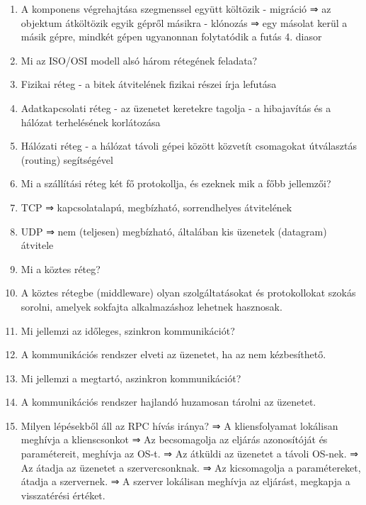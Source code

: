 \documentclass[twoside, a4paper, 12pt]{article}
\begin{document}
\begin{enumerate}
            \item A komponens végrehajtása szegmenssel együtt költözik
                - migráció ⇒ az objektum átköltözik egyik gépről másikra
                - klónozás ⇒ egy másolat kerül a másik gépre, mindkét gépen ugyanonnan folytatódik a futás
                4. diasor
            \item  Mi az ISO/OSI modell alsó három rétegének feladata?
            \item Fizikai réteg
                - a bitek átvitelének fizikai részei írja lefutása
            \item Adatkapcsolati réteg
                - az üzenetet keretekre tagolja
                - a hibajavítás és a hálózat terhelésének korlátozása
            \item Hálózati réteg
                - a hálózat távoli gépei között közvetít csomagokat útválasztás (routing) segítségével
            \item  Mi a szállítási réteg két fő protokollja, és ezeknek mik a főbb jellemzői?
            \item TCP ⇒ kapcsolatalapú, megbízható, sorrendhelyes átvitelének
            \item UDP ⇒ nem (teljesen) megbízható, általában kis üzenetek (datagram) átvitele	
            \item  Mi a köztes réteg?
            \item A köztes rétegbe (middleware) olyan szolgáltatásokat és protokollokat szokás sorolni, amelyek sokfajta alkalmazáshoz lehetnek hasznosak.
            \item  Mi jellemzi az időleges, szinkron kommunikációt?
            \item A kommunikációs rendszer elveti az üzenetet, ha az nem kézbesíthető.
            \item  Mi jellemzi a megtartó, aszinkron kommunikációt?
            \item A kommunikációs rendszer hajlandó huzamosan tárolni az üzenetet.
            \item  Milyen lépésekből áll az RPC hívás iránya?
                ⇒ A kliensfolyamat lokálisan meghívja a klienscsonkot
                ⇒ Az becsomagolja az eljárás azonosítóját és paramétereit, meghívja az OS-t.
                ⇒ Az átküldi az üzenetet a távoli OS-nek.
                ⇒ Az átadja az üzenetet a szervercsonknak.
                ⇒ Az kicsomagolja a paramétereket, átadja a szervernek.
                ⇒ A szerver lokálisan meghívja az eljárást, megkapja a visszatérési értéket.

\end{enumerate}
\end{document}
